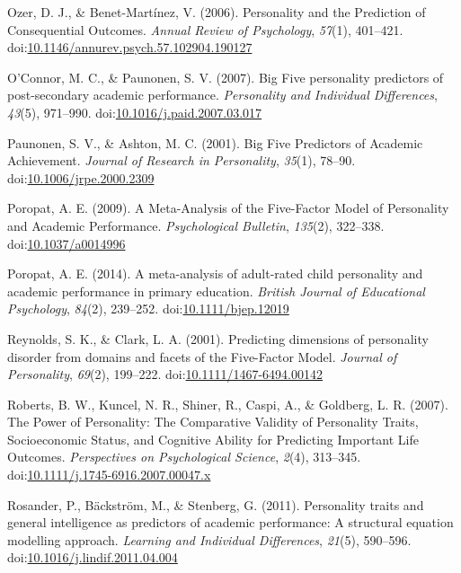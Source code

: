 \documentclass[,man,floatsintext]{apa6}
\begin{document}
\hypertarget{ref-OzerBenet2006}{}
Ozer, D. J., \& Benet-Martínez, V. (2006). Personality and the
Prediction of Consequential Outcomes. \emph{Annual Review of
Psychology}, \emph{57}(1), 401--421.
doi:\href{https://doi.org/10.1146/annurev.psych.57.102904.190127}{10.1146/annurev.psych.57.102904.190127}

\hypertarget{ref-OConnor2007}{}
O'Connor, M. C., \& Paunonen, S. V. (2007). Big Five personality
predictors of post-secondary academic performance. \emph{Personality and
Individual Differences}, \emph{43}(5), 971--990.
doi:\href{https://doi.org/10.1016/j.paid.2007.03.017}{10.1016/j.paid.2007.03.017}

\hypertarget{ref-Paunonen2001}{}
Paunonen, S. V., \& Ashton, M. C. (2001). Big Five Predictors of
Academic Achievement. \emph{Journal of Research in Personality},
\emph{35}(1), 78--90.
doi:\href{https://doi.org/10.1006/jrpe.2000.2309}{10.1006/jrpe.2000.2309}

\hypertarget{ref-Poropat2009}{}
Poropat, A. E. (2009). A Meta-Analysis of the Five-Factor Model of
Personality and Academic Performance. \emph{Psychological Bulletin},
\emph{135}(2), 322--338.
doi:\href{https://doi.org/10.1037/a0014996}{10.1037/a0014996}

\hypertarget{ref-Poropat2014}{}
Poropat, A. E. (2014). A meta-analysis of adult-rated child personality
and academic performance in primary education. \emph{British Journal of
Educational Psychology}, \emph{84}(2), 239--252.
doi:\href{https://doi.org/10.1111/bjep.12019}{10.1111/bjep.12019}

\hypertarget{ref-ClarkReynolds2001}{}
Reynolds, S. K., \& Clark, L. A. (2001). Predicting dimensions of
personality disorder from domains and facets of the Five-Factor Model.
\emph{Journal of Personality}, \emph{69}(2), 199--222.
doi:\href{https://doi.org/10.1111/1467-6494.00142}{10.1111/1467-6494.00142}

\hypertarget{ref-Roberts2007}{}
Roberts, B. W., Kuncel, N. R., Shiner, R., Caspi, A., \& Goldberg, L. R.
(2007). The Power of Personality: The Comparative Validity of
Personality Traits, Socioeconomic Status, and Cognitive Ability for
Predicting Important Life Outcomes. \emph{Perspectives on Psychological
Science}, \emph{2}(4), 313--345.
doi:\href{https://doi.org/10.1111/j.1745-6916.2007.00047.x}{10.1111/j.1745-6916.2007.00047.x}

\hypertarget{ref-Rosander2011}{}
Rosander, P., Bäckström, M., \& Stenberg, G. (2011). Personality traits
and general intelligence as predictors of academic performance: A
structural equation modelling approach. \emph{Learning and Individual
Differences}, \emph{21}(5), 590--596.
doi:\href{https://doi.org/10.1016/j.lindif.2011.04.004}{10.1016/j.lindif.2011.04.004}
\end{document}

